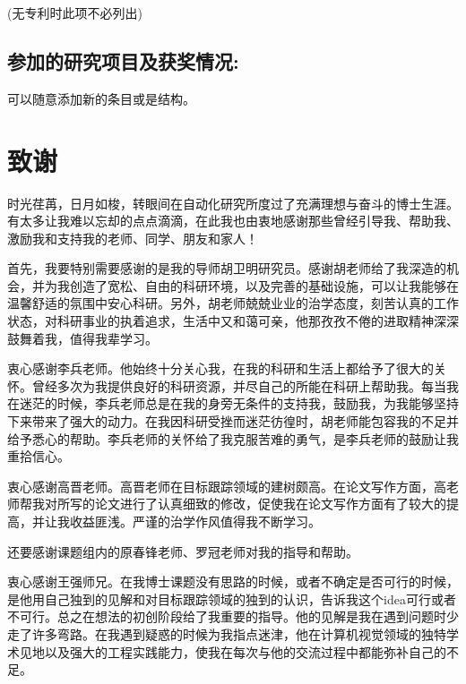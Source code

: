 (无专利时此项不必列出)

\section*{参加的研究项目及获奖情况:}

可以随意添加新的条目或是结构。

\chapter[致谢]{致\quad 谢}%
\thispagestyle{noheaderstyle}%

时光荏苒，日月如梭，转眼间在自动化研究所度过了充满理想与奋斗的博士生涯。有太多让我难以忘却的点点滴滴，在此我也由衷地感谢那些曾经引导我、帮助我、激励我和支持我的老师、同学、朋友和家人！

首先，我要特别需要感谢的是我的导师胡卫明研究员。感谢胡老师给了我深造的机会，并为我创造了宽松、自由的科研环境，以及完善的基础设施，可以让我能够在温馨舒适的氛围中安心科研。另外，胡老师兢兢业业的治学态度，刻苦认真的工作状态，对科研事业的执着追求，生活中又和蔼可亲，他那孜孜不倦的进取精神深深鼓舞着我，值得我辈学习。

衷心感谢李兵老师。他始终十分关心我，在我的科研和生活上都给予了很大的关怀。曾经多次为我提供良好的科研资源，并尽自己的所能在科研上帮助我。每当我在迷茫的时候，李兵老师总是在我的身旁无条件的支持我，鼓励我，为我能够坚持下来带来了强大的动力。在我因科研受挫而迷茫彷徨时，胡老师能包容我的不足并给予悉心的帮助。李兵老师的关怀给了我克服苦难的勇气，是李兵老师的鼓励让我重拾信心。

衷心感谢高晋老师。高晋老师在目标跟踪领域的建树颇高。在论文写作方面，高老师帮我对所写的论文进行了认真细致的修改，促使我在论文写作方面有了较大的提高，并让我收益匪浅。严谨的治学作风值得我不断学习。

还要感谢课题组内的原春锋老师、罗冠老师对我的指导和帮助。

衷心感谢王强师兄。在我博士课题没有思路的时候，或者不确定是否可行的时候，是他用自己独到的见解和对目标跟踪领域的独到的认识，告诉我这个idea可行或者不可行。总之在想法的初创阶段给了我重要的指导。他的见解是我在遇到问题时少走了许多弯路。在我遇到疑惑的时候为我指点迷津，他在计算机视觉领域的独特学术见地以及强大的工程实践能力，使我在每次与他的交流过程中都能弥补自己的不足。

